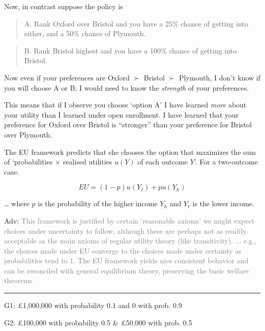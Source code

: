 \documentclass[]{article}
\begin{document}
\bigskip

Now, in contrast suppose the policy is

\begin{quote}
A. Rank Oxford over Bristol and you have a 25\% chance of getting into either, and a 50\% chance of Plymouth.
\end{quote}

\begin{quote}
B. Rank Bristol highest and you have a 100\% chance of getting into Bristol.
\end{quote}

Now even if your preferences are Oxford \(\succ\) Bristol \(\succ\) Plymouth, I don't know if you will choose A or B; I would need to know the \emph{strength} of your preferences.

\bigskip

This means that if I observe you choose `option A' I have learned \emph{more} about your utility than I learned under open enrollment. I have learned that your preference for Oxford over Bristol is ``stronger'' than your preference for Bristol over Plymouth.

\bigskip

The EU framework predicts that she chooses the option that maximizes the sum of `probabilities \(\times\) realised utilities \(u(Y)\) of each outcome \(Y\)'. For a two-outcome case:

\[EU = (1-p) u(Y_\ell) + p u(Y_h)\]

\ldots{} where \(p\) is the probability of the higher income \(Y_h\) and \(Y_\ell\) is the lower income.

\bigskip

\textcolor{RawSienna}{Adv:} \textcolor{gray}{This framework is justified by certain 'reasonable axioms' we might expect choices under uncertainty to follow,
although these are perhaps not as readily acceptable as the main axioms of regular utility theory (like transitivity).
... e.g., the choices made under EU converge to the choices made under certainty as probabilities tend to 1.
The EU framework yields nice consistent behavior and can be reconciled with general equilibrium theory, preserving the basic welfare theorems}

\begin{center}\rule{0.5\linewidth}{\linethickness}\end{center}

G1: \pounds1,000,000 with probability 0.1 and 0 with prob. 0.9

G2: \pounds100,000 with probability 0.5 \& \pounds50,000 with prob. 0.5
\end{document}

